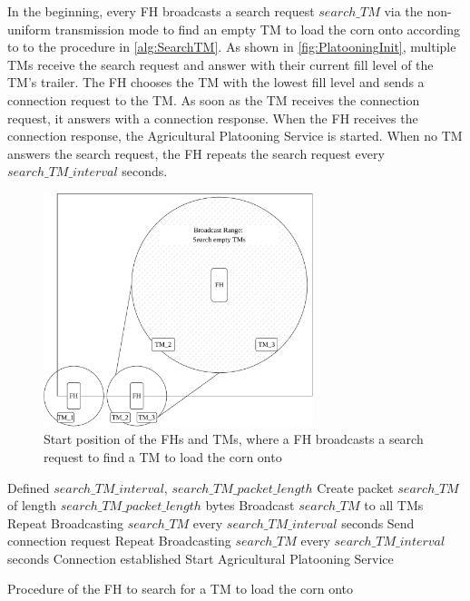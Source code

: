 In the beginning, every \ac{FH} broadcasts a search request $search\_TM$ via the non-uniform transmission mode to find an empty \ac{TM} to load the corn onto according to
to the procedure in \autoref{alg:SearchTM}.
As shown in \autoref{fig:PlatooningInit}, multiple \ac{TM}s receive the search request and answer with
their current fill level of the \ac{TM}'s trailer.
The \ac{FH} chooses the \ac{TM} with the lowest fill level and sends a connection request to the \ac{TM}.
As soon as the \ac{TM} receives the connection request, it answers with a connection response.
When the \ac{FH} receives the connection response, the Agricultural Platooning Service is started.
When no \ac{TM} answers the search request, the \ac{FH} repeats the search request every $search\_TM\_interval$ seconds.
\begin{figure}[H]%
   \centering
   \includegraphics[width=0.7\textwidth]{figures/platoonINIT}
   \caption{Start position of the \acf{FH}s and \acf{TM}s, where a \ac{FH} broadcasts a search request to find
   a \ac{TM} to load the corn onto}
   \label{fig:PlatooningInit}%
\end{figure}

\begin{algorithm}
\begin{algorithmic}[1]
\REQUIRE Defined $search\_TM\_interval$, $search\_TM\_packet\_length$
\STATE Create packet $search\_TM$ of length $search\_TM\_packet\_length$ bytes
\STATE Broadcast $search\_TM$ to all \acs{TM}s
    \STATE Repeat Broadcasting $search\_TM$ every $search\_TM\_interval$ seconds
\ELSE
   \STATE Send connection request
      \STATE Repeat Broadcasting $search\_TM$ every $search\_TM\_interval$ seconds
   \ELSE
      \STATE Connection established
      \STATE Start Agricultural Platooning Service
   \ENDIF
\ENDIF
\end{algorithmic}
\caption{Procedure of the \acf{FH} to search for a \acf{TM} to load the corn onto}
\label{alg:SearchTM}
\end{algorithm}

